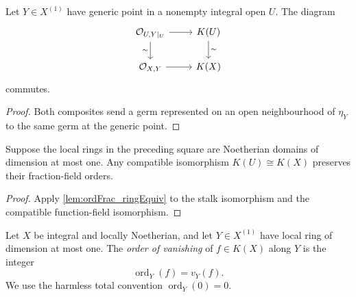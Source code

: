 \begin{lemma}
  \label{lem:functionFieldIso_compat}
  \leanok

  Let \(Y\in X^{(1)}\) have generic point in a nonempty integral open
  \(U\).  The diagram
  \[
  \begin{tikzcd}
    \mathcal O_{U,Y|_U} \arrow[r] \arrow[d, "\sim"']
      & K(U) \arrow[d, "\sim"] \\
    \mathcal O_{X,Y} \arrow[r] & K(X)
  \end{tikzcd}
  \]
  commutes.
\end{lemma}
\begin{proof}
  \leanok
  Both composites send a germ represented on an open neighbourhood of
  \(\eta_Y\) to the same germ at the generic point.
\end{proof}

\begin{lemma}
  \label{lem:ordFrac_stalkIso_naturality}
  \leanok

  Suppose the local rings in the preceding square are Noetherian domains of
  dimension at most one.  Any compatible isomorphism \(K(U)\cong K(X)\)
  preserves their fraction-field orders.
\end{lemma}
\begin{proof}
  \leanok
  Apply \cref{lem:ordFrac_ringEquiv} to the stalk isomorphism and the
  compatible function-field isomorphism.
\end{proof}

\begin{definition}
  \label{def:order_at_point}
  \leanok

  Let \(X\) be integral and locally Noetherian, and let \(Y\in X^{(1)}\)
  have local ring of dimension at most one.  The \emph{order of vanishing}
  of \(f\in K(X)\) along \(Y\) is the integer
  \[
    \operatorname{ord}_Y(f)=v_Y(f).
  \]
  We use the harmless total convention \(\operatorname{ord}_Y(0)=0\).
\end{definition}

